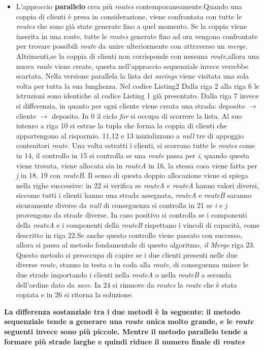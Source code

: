\documentclass[]{article}
\begin{document}
\begin{itemize}
\item  L'approccio \textbf{parallelo} crea più \emph{routes} contemporaneamente.Quando una coppia di clienti è presa in considerazione, viene confrontata con tutte le \emph{routes} che sono già state generate fino a quel momento.
Se la coppia viene inserita in una route, tutte le \emph{routes} generate fino ad ora vengono confrontate per trovare possibili \emph{route} da unire ulteriormente con attraverso un \emph{merge}. Altrimenti,se la coppia di clienti non corrisponde con nessuna \emph{route},allora una nuova \emph{route} viene create, questa nell'approccio sequenziale invece verrebbe scartata. Nella versione parallela la lista dei \emph{savings} viene visitata una sola volta per tutta la sua lunghezza.
Nel codice Listing2 Dalla riga 2 alla riga 6 le istruzioni sono identiche al codice Listing 1 già presentato. Dalla riga 7 invece si differenzia, in quanto per ogni cliente viene creata una strada: deposito $\rightarrow$ cliente $\rightarrow$ deposito. In 0 il ciclo \emph{for} si occupa di scorrere la lista. Al suo intenro a riga 10 si estrae la tupla che forma la coppia di clienti che appartengono al risparmio. 11,12 e 13 inizializzano a \emph{null} tre di appoggio contenitori \emph{route}. Una volta estratti i clienti, si scorrono tutte le \emph{routes} come in 14, il controllo in 15 si controlla se una \emph{route} passa per \emph{i}, quando questa viene trovata, viene allocata sia in \emph{routeA} in 16, la stessa cosa viene fatta per \emph{j} in 18, 19 con  \emph{routeB}. Il senso di questa doppio allocazione viene si spiega nella righe successive: in 22 si verifica se  \emph{routeA} e \emph{routeA} hanno valori diversi, siccome tutti i clienti hanno una strada assegnata, \emph{routeA} e \emph{routeB} saranno sicuramente diverse da \emph{null} di conseguenza si controlla in 21 se \emph{i} e \emph{j} provengono da strade diverse. In caso positivo si controlla se i componenti della \emph{routeA} e i componenti della \emph{routeB}  rispettano i vincoli di capacità, come descritto in riga 22.Se anche questo controllo viene passato con successo, allora si passa al metodo fondamentale di questo algoritmo, \emph{il Merge}	riga 23.
Questo metodo si preoccupa di capire se i due clienti presenti nelle due diverse \emph{route}, stanno in testa o in coda alla \emph{route}, di conseguenza unisce le due strade importando i clienti nella \emph{routeA} o nella \emph{routeB} a seconda dell'ordine dato da \emph{save}. In 24 si rimuove da \emph{routes} la \emph{route} che è stata copiata e in 26 si ritorna la soluzione.
\end{itemize}
\textbf{
La differenza sostanziale tra i due metodi è la seguente: il metodo sequenziale tende a generare una \emph{route} unica molto grande, e le \emph{route} seguenti invece sono più piccole. Mentre il metodo parallelo tende a formare più strade larghe e quindi riduce il numero finale di \emph{routes}} 
\end{document}
